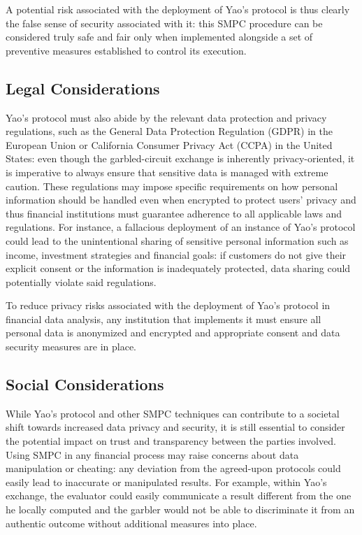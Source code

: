 \documentclass[12pt]{article}
\begin{document}
A potential risk associated with the deployment of Yao's protocol is thus clearly the false sense of security associated with it: this SMPC procedure can be considered truly safe and fair only when implemented alongside a set of preventive measures established to control its execution.

\subsection{Legal Considerations}

Yao's protocol must also abide by the relevant data protection and privacy regulations, such as the General Data Protection Regulation (GDPR) in the European Union or California Consumer Privacy Act (CCPA) in the United States: even though the garbled-circuit exchange is inherently privacy-oriented, it is imperative to always ensure that sensitive data is managed with extreme caution. These regulations may impose specific requirements on how personal information should be handled even when encrypted to protect users' privacy and thus financial institutions must guarantee adherence to all applicable laws and regulations. For instance, a fallacious deployment of an instance of Yao's protocol could lead to the unintentional sharing of sensitive personal information such as income, investment strategies and financial goals: if customers do not give their explicit consent or the information is inadequately protected, data sharing could potentially violate said regulations.

To reduce privacy risks associated with the deployment of Yao's protocol in financial data analysis, any institution that implements it must ensure all personal data is anonymized and encrypted and appropriate consent and data security measures are in place.

\subsection{Social Considerations}

While Yao's protocol and other SMPC techniques can contribute to a societal shift towards increased data privacy and security, it is still essential to consider the potential impact on trust and transparency between the parties involved. Using SMPC in any financial process may raise concerns about data manipulation or cheating: any deviation from the agreed-upon protocols could easily lead to inaccurate or manipulated results. For example, within Yao's exchange, the evaluator could easily communicate a result different from the one he locally computed and the garbler would not be able to discriminate it from an authentic outcome without additional measures into place. 
\end{document}
